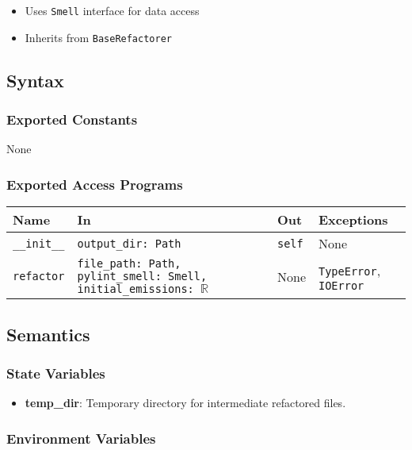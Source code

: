 \documentclass[12pt, titlepage]{article}
\begin{document}
\begin{itemize}
  \item Uses \texttt{Smell} interface for data access
  \item Inherits from \texttt{BaseRefactorer}
\end{itemize}

\subsection{Syntax}

\subsubsection{Exported Constants}
None

\subsubsection{Exported Access Programs}

\begin{center}
\begin{tabularx}{\linewidth}{|l|>{\raggedright\arraybackslash}X|p{1in}|p{1in}|}
\hline
\textbf{Name} & \textbf{In} & \textbf{Out} & \textbf{Exceptions} \\
\hline
\texttt{\_\_init\_\_} & \texttt{output\_dir: Path} & \texttt{self} & None \\
\hline
\texttt{refactor} & \texttt{file\_path: Path, pylint\_smell: Smell, initial\_emissions: $\mathbb{R}$} & None & \texttt{TypeError}, \texttt{IOError} \\
\hline
\end{tabularx}
\end{center}


\subsection{Semantics}

\subsubsection{State Variables}

\begin{itemize}
  \item \textbf{temp\_dir}: Temporary directory for intermediate refactored files.
\end{itemize}

\subsubsection{Environment Variables}
\end{document}
